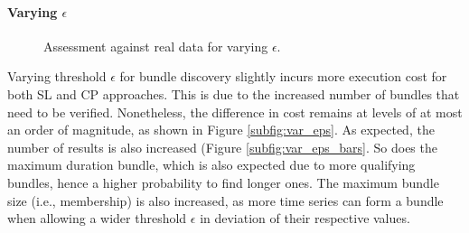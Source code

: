 \paragraph{Varying $\epsilon$}
\begin{figure}[!ht]
 \centering
 \caption{Assessment against real data for varying $\epsilon$.}
 \label{fig:exp2}
\end{figure}

Varying threshold $\epsilon$ for bundle discovery slightly incurs more execution cost for both SL and CP approaches. This is due to the increased number of bundles that need to be verified. Nonetheless, the difference in cost remains at levels of at most an order of magnitude, as shown in Figure \ref{subfig:var_eps}. As expected, the number of results is also increased (Figure \ref{subfig:var_eps_bars}. So does the maximum duration bundle, which is also expected due to more qualifying bundles, hence a higher probability to find longer ones. The maximum bundle size (i.e., membership) is also increased, as more time series can form a bundle when allowing a wider threshold $\epsilon$ in deviation of their respective values.


